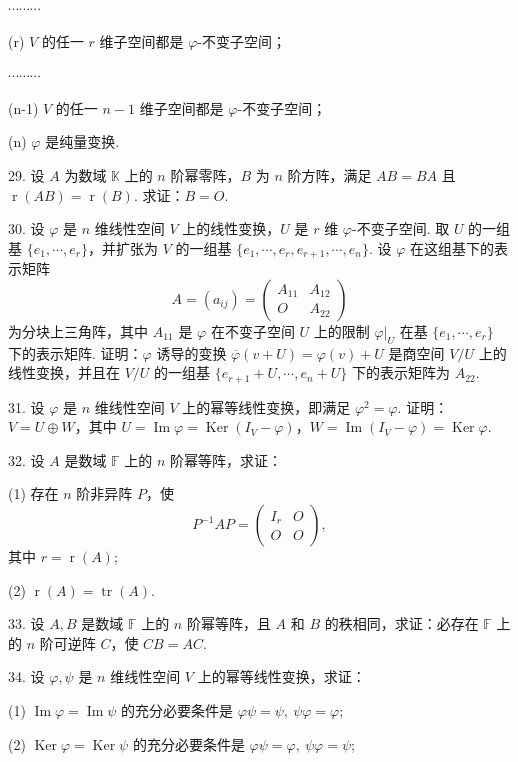 \documentclass[UTF8,12pt,a4paper,fontset=fandol]{ctexart}
\begin{document}
$\cdots\cdots\cdots$

(r) $V$ 的任一 $r$ 维子空间都是 $\varphi$-不变子空间；

$\cdots\cdots\cdots$

(n-1) $V$ 的任一 $n-1$ 维子空间都是 $\varphi$-不变子空间；

(n) $\varphi$ 是纯量变换.

29. 设 $A$ 为数域 $\mathbb{K}$ 上的 $n$ 阶幂零阵，$B$ 为 $n$ 阶方阵，满足 $AB=BA$ 且 $\operatorname{r}(AB)=\operatorname{r}(B)$. 求证：$B=O$.

30. 设 $\varphi$ 是 $n$ 维线性空间 $V$ 上的线性变换，$U$ 是 $r$ 维 $\varphi$-不变子空间. 取 $U$ 的一组基 $\{e_1,\cdots,e_r\}$，并扩张为 $V$ 的一组基 $\{e_1,\cdots,e_r,e_{r+1},\cdots,e_n\}$. 设 $\varphi$ 在这组基下的表示矩阵
\[
A=(a_{ij})=
\left(\begin{array}{cc}
A_{11} & A_{12}\\
O & A_{22}
\end{array}\right)
\]
为分块上三角阵，其中 $A_{11}$ 是 $\varphi$ 在不变子空间 $U$ 上的限制 $\varphi|_U$ 在基 $\{e_1,\cdots,e_r\}$ 下的表示矩阵. 证明：$\varphi$ 诱导的变换 $\overline{\varphi}(v+U)=\varphi(v)+U$ 是商空间 $V/U$ 上的线性变换，并且在 $V/U$ 的一组基 $\{e_{r+1}+U,\cdots,e_n+U\}$ 下的表示矩阵为 $A_{22}$.

31. 设 $\varphi$ 是 $n$ 维线性空间 $V$ 上的幂等线性变换，即满足 $\varphi^2=\varphi$. 证明：$V=U\oplus W$，其中 $U=\operatorname{Im}\varphi=\operatorname{Ker}(I_V-\varphi)$，$W=\operatorname{Im}(I_V-\varphi)=\operatorname{Ker}\varphi$.

32. 设 $A$ 是数域 $\mathbb{F}$ 上的 $n$ 阶幂等阵，求证：

(1) 存在 $n$ 阶非异阵 $P$，使
\[
P^{-1}AP=
\left(\begin{array}{cc}
I_r & O\\
O & O
\end{array}\right),
\]
其中 $r=\operatorname{r}(A)$;

(2) $\operatorname{r}(A)=\operatorname{tr}(A)$.

33. 设 $A,B$ 是数域 $\mathbb{F}$ 上的 $n$ 阶幂等阵，且 $A$ 和 $B$ 的秩相同，求证：必存在 $\mathbb{F}$ 上的 $n$ 阶可逆阵 $C$，使 $CB=AC$.

34. 设 $\varphi,\psi$ 是 $n$ 维线性空间 $V$ 上的幂等线性变换，求证：

(1) $\operatorname{Im}\varphi=\operatorname{Im}\psi$ 的充分必要条件是 $\varphi\psi=\psi,\ \psi\varphi=\varphi$;

(2) $\operatorname{Ker}\varphi=\operatorname{Ker}\psi$ 的充分必要条件是 $\varphi\psi=\varphi,\ \psi\varphi=\psi$;
\end{document}

